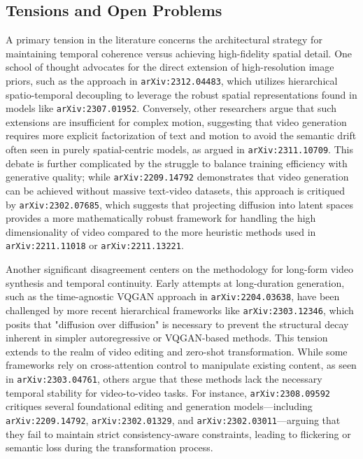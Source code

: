 \documentclass[11pt]{article}
\begin{document}
\subsection{Tensions and Open Problems}

A primary tension in the literature concerns the architectural strategy for maintaining temporal coherence versus achieving high-fidelity spatial detail. One school of thought advocates for the direct extension of high-resolution image priors, such as the approach in \texttt{arXiv:2312.04483}, which utilizes hierarchical spatio-temporal decoupling to leverage the robust spatial representations found in models like \texttt{arXiv:2307.01952}. Conversely, other researchers argue that such extensions are insufficient for complex motion, suggesting that video generation requires more explicit factorization of text and motion to avoid the semantic drift often seen in purely spatial-centric models, as argued in \texttt{arXiv:2311.10709}. This debate is further complicated by the struggle to balance training efficiency with generative quality; while \texttt{arXiv:2209.14792} demonstrates that video generation can be achieved without massive text-video datasets, this approach is critiqued by \texttt{arXiv:2302.07685}, which suggests that projecting diffusion into latent spaces provides a more mathematically robust framework for handling the high dimensionality of video compared to the more heuristic methods used in \texttt{arXiv:2211.11018} or \texttt{arXiv:2211.13221}.

Another significant disagreement centers on the methodology for long-form video synthesis and temporal continuity. Early attempts at long-duration generation, such as the time-agnostic VQGAN approach in \texttt{arXiv:2204.03638}, have been challenged by more recent hierarchical frameworks like \texttt{arXiv:2303.12346}, which posits that "diffusion over diffusion" is necessary to prevent the structural decay inherent in simpler autoregressive or VQGAN-based methods. This tension extends to the realm of video editing and zero-shot transformation. While some frameworks rely on cross-attention control to manipulate existing content, as seen in \texttt{arXiv:2303.04761}, others argue that these methods lack the necessary temporal stability for video-to-video tasks. For instance, \texttt{arXiv:2308.09592} critiques several foundational editing and generation models—including \texttt{arXiv:2209.14792}, \texttt{arXiv:2302.01329}, and \texttt{arXiv:2302.03011}—arguing that they fail to maintain strict consistency-aware constraints, leading to flickering or semantic loss during the transformation process.
\end{document}
